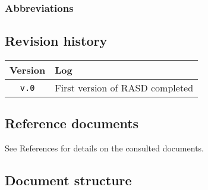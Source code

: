       \begin{description}
        \item[] %
      \end{description}

    \subsubsection{Abbreviations}

      \begin{description}
        \item[] %
      \end{description}

  \subsection{Revision history}

  \label{sec:revhistory}
    \begin{table}[!h]
      \begin{tabular}{|c|l|}
        \hline
        \textbf{Version}                & \textbf{Log} \\ \hline
        \texttt{v.0} &
          First version of RASD completed
        \\ \hline
      \end{tabular}
    \end{table}

  \subsection{Reference documents}

    See References for details on the consulted documents.

  \subsection{Document structure}


